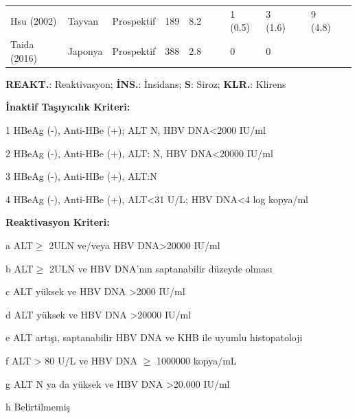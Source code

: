 \begin{table}
\begin{minipage}[c]{\textwidth}
\begin{threeparttable}
{\begin{tabular}{llllL{1cm}L{1.4cm}L{1.4cm}llL{1cm}L{1.7cm}L{1.7cm}}
Hsu (2002)  \cite{hsu2002long}             & Tayvan        & Prospektif      & 189        & 8.2                &                        &                          & 1 (0.5)        & 3 (1.6)            &                        & 9 (4.8)                   &                              \\
Taida (2016)  \cite{taida2017prognosis}           & Japonya       & Prospektif      & 388        & 2.8                &                        &                          & 0                & 0                  &                        &                           &     \\
\bottomrule                        
\end{tabular}}
\footnotesize
\begin{tablenotes}
\item \textbf{REAKT.}: Reaktivasyon; \textbf{İNS.}: İnsidans; \textbf{S}: Siroz; \textbf{KLR.}: Klirens \par
\textbf{İnaktif Taşıyıcılık Kriteri:} \par
\item [1] HBeAg (-), Anti-HBe (+); ALT N, HBV DNA<2000 IU/ml \par
\item [2] HBeAg (-), Anti-HBe (+), ALT: N, HBV DNA<20000 IU/ml \par
\item [3] HBeAg (-), Anti-HBe (+), ALT:N \par
\item [4] HBeAg (-), Anti-HBe (+), ALT<31 U/L; HBV DNA<4 log kopya/ml \par
\textbf{Reaktivasyon Kriteri:} \par
\item[a] ALT$ \geq $ 2ULN ve/veya HBV DNA>20000 IU/ml \par
\item[b] ALT$ \geq $ 2ULN ve HBV DNA'nın saptanabilir düzeyde olması \par
\item [c] ALT yüksek ve HBV DNA >2000 IU/ml \par
\item [d] ALT yüksek ve HBV DNA >20000 IU/ml \par
\item [e] ALT artışı, saptanabilir HBV DNA ve KHB ile uyumlu histopatoloji \par
\item [f] ALT > 80 U/L ve HBV DNA   $ \geq $ 1000000 kopya/mL \par
\item [g] ALT N ya da yüksek ve HBV DNA >20.000 IU/ml \par
\item [h] Belirtilmemiş



\end{tablenotes}
\end{threeparttable}
\end{minipage}
\end{table}
